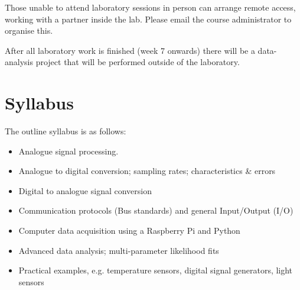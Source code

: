 Those unable to attend laboratory sessions in person can arrange remote access, working with a partner inside the lab.
Please email the course administrator to organise this.

After all laboratory work is finished (week 7 onwards) there will be a data-analysis project that will be performed outside of the laboratory.

\newpage
\section{Syllabus}

The outline syllabus is as follows:
\begin{itemize}
\item Analogue signal processing. %
\item Analogue to digital conversion; sampling rates; characteristics \& errors
\item Digital to analogue signal conversion
\item Communication protocols (Bus standards) and general Input/Output (I/O)
\item Computer data acquisition using a Raspberry Pi and Python %
\item Advanced data analysis; multi-parameter likelihood fits
\item Practical examples, e.g. temperature sensors, digital signal generators, light sensors
\end{itemize}

